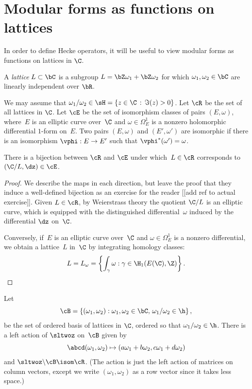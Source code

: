 \documentclass{report}
\begin{document}
\section{Modular forms as functions on lattices}
In order to
define Hecke operators, it will be useful to view modular forms as
functions on lattices in $\C$.

\begin{definition}[Lattice]
A {\em lattice} $L\subset \bC$ is a subgroup $L=\bZ\omega_1
+\bZ\omega_2$ for which $\omega_1, \omega_2\in \bC$ are linearly
independent over $\bR$.
\end{definition}

We may assume that $\omega_1 / \omega_2
\in \sH = \{z\in\C\,:\, \Im(z)>0\}$.  Let $\cR$ be the set of all
lattices in $\C$.   Let $\cE$ be the set of isomorphism classes of
pairs $(E,\omega)$, where~$E$ is an elliptic curve over~$\C$ and
$\omega\in\Omega_E^1$ is a nonzero holomorphic differential
$1$-form on~$E$.  Two pairs $(E,\omega)$ and $(E',\omega')$ are
isomorphic if there is an isomorphism $\vphi:E\to E'$ such that
$\vphi^*(\omega')=\omega$.
\begin{proposition}\label{prop:RcorrE}
There is a bijection between $\cR$ and $\cE$ under which~$L\in\cR$
corresponds to $(\C/L,\dz)\in\cE$.
\end{proposition}
\begin{proof}
  We describe the maps in each direction, but leave the proof that
  they induce a well-defined bijection as an exercise for the reader
  [[add ref to actual exercise]]. Given $L\in \cR$, by Weierstrass
  theory the quotient $\C/L$ is an elliptic curve, which is equipped
  with the distinguished differential~$\omega$ induced by the
  differential $\dz$ on~$\C$.

Conversely, if~$E$ is an elliptic curve over~$\C$ and $\omega\in
\Omega^1_E$ is a nonzero differential, we obtain a lattice~$L$
in~$\C$ by integrating homology classes:
\[
  L = L_\omega = \left\{\int_\gamma \omega : \gamma\in\H_1(E(\C),\Z) \right\}.
\]
\end{proof}

Let
\[
  \cB=\left\{(\omega_1,\omega_2):\omega_1,\omega_2\in\bC,
  \,\omega_1/\omega_2\in\h\right\},
\]
be the set of ordered basis of lattices in $\C$, ordered so that
$\omega_1/\omega_2\in\h$.  There is a left action of $\sltwoz$
on~$\cB$ given by
\[
  \abcd(\omega_1,\omega_2)\mapsto
      (a\omega_1+b\omega_2,c\omega_1+d\omega_2)
\]
and $\sltwoz\backslash \cB\isom \cR$.  (The action is just the left
action of matrices on column vectors, except we write
$(\omega_1,\omega_2)$ as a row vector since it takes less space.)
\end{document}

